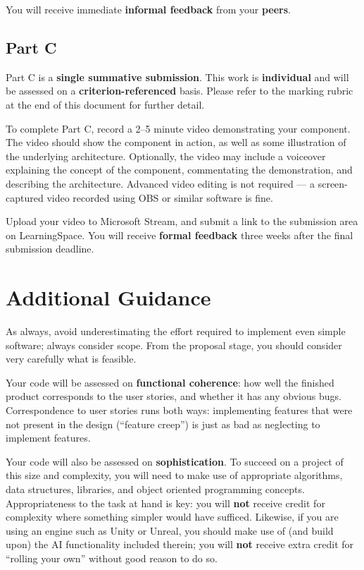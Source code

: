 \documentclass{../../fal_assignment}
\begin{document}
You will receive immediate \textbf{informal feedback} from your \textbf{peers}.

\subsection*{Part C}

Part C is a \textbf{single summative submission}. This work is \textbf{individual} and will be assessed on a \textbf{criterion-referenced} basis. Please refer to the marking rubric at the end of this document for further detail.

To complete Part C, record a 2--5 minute video demonstrating your component.
The video should show the component in action, as well as some illustration of the underlying architecture.
Optionally, the video may include a voiceover explaining the concept of the component,
commentating the demonstration, and describing the architecture.
Advanced video editing is not required --- a screen-captured video recorded using OBS or similar software is fine.

Upload your video to Microsoft Stream, and submit a link to the submission area on LearningSpace.
You will receive \textbf{formal feedback} three weeks after the final submission deadline.

\section*{Additional Guidance}

As always, avoid underestimating the effort required to implement even simple software; always consider scope.
From the proposal stage, you should consider very carefully what is feasible.

Your code will be assessed on \textbf{functional coherence}:
how well the finished product corresponds to the user stories,
and whether it has any obvious bugs.
Correspondence to user stories runs both ways:
implementing features that were not present in the design (``feature creep'')
is just as bad as neglecting to implement features.

Your code will also be assessed on \textbf{sophistication}.
To succeed on a project of this size and complexity,
you will need to make use of appropriate algorithms, data structures, libraries, and object oriented programming concepts.
Appropriateness to the task at hand is key:
you will \textbf{not} receive credit for complexity  
where something simpler would have sufficed.
Likewise, if you are using an engine such as Unity or Unreal,
you should make use of (and build upon) the AI functionality included therein;
you will \textbf{not} receive extra credit for ``rolling your own'' without good reason to do so.
\end{document}
